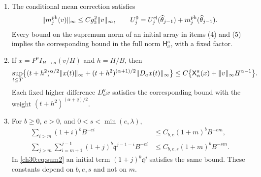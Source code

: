 \begin{lemma}
\begin{enumerate}
\item The conditional mean correction satisfies
\begin{equation}\label{ch30:eq:local-mean}
 \lVert m_j^{\mathrm{ph}}(v)\rVert_\infty\le Cg_3^2\lVert v\rVert_\infty,\qquad
 U_j^0=U_j^{\mathrm{cl}}(\widehat\theta_{j-1})+m_j^{\mathrm{ph}}(\widehat\theta_{j-1}).
\end{equation}
Every bound on the supremum norm of an initial array in items (4) and (5) implies the corresponding bound in the full norm $\mathsf H_\sigma^a$, with a fixed factor.
\item If $x=P_\cdot^aI_{H\to a}(v/H)$ and $h=H/B$, then
\begin{equation}\label{ch30:eq:input-radius}
 \sup_{t\le T}\bigl\{(t+h^2)^{\alpha/2}\lVert x(t)\rVert_\infty+(t+h^2)^{(\alpha+1)/2}\lVert D_ax(t)\rVert_\infty\bigr\}
 \le C\bigl\{\mathsf X_\alpha^a(x)+\lVert v\rVert_\infty H^{\alpha-1}\bigr\}.
\end{equation}
Each fixed higher difference $D_a^qx$ satisfies the corresponding bound with the weight $(t+h^2)^{(\alpha+q)/2}$.
\item For $b\ge0$, $e>0$, and $0<s<\min(e,\lambda)$,
\begin{align}
 \sum_{i>m}(1+i)^bB^{-ei}&\le C_{b,e}(1+m)^bB^{-em},\label{ch30:eq:sum1}\\
 \sum_{j>m}\sum_{i=m+1}^{j-1}(1+j)^b\mathfrak q^{j-1-i}B^{-ei}&\le C_{b,e,s}(1+m)^bB^{-sm}.\label{ch30:eq:sum2}
\end{align}
In \eqref{ch30:eq:sum2} an initial term $(1+j)^b\mathfrak q^j$ satisfies the same bound. These constants depend on $b,e,s$ and not on $m$.
\end{enumerate}
\end{lemma}

